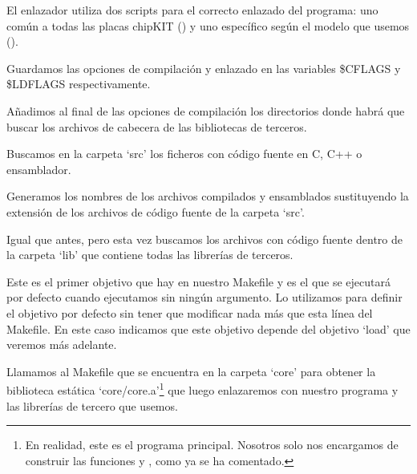  
 El enlazador utiliza dos scripts para el correcto enlazado del programa: uno común a todas las placas chipKIT () y uno específico según el modelo que usemos ().
 
 
 Guardamos las opciones de compilación y enlazado en las variables \$CFLAGS y \$LDFLAGS respectivamente.
 
 
 Añadimos al final de las opciones de compilación los directorios donde habrá que buscar los archivos de cabecera de las bibliotecas de terceros.
 
 
 Buscamos en la carpeta `src' los ficheros con código fuente en C, C++ o ensamblador.
 
 
 Generamos los nombres de los archivos compilados y ensamblados sustituyendo la extensión de los archivos de código fuente de la carpeta `src'.
 
 
 Igual que antes, pero esta vez buscamos los archivos con código fuente dentro de la carpeta `lib' que contiene todas las librerías de terceros.
 
 
 Este es el primer objetivo que hay en nuestro Makefile y es el que se ejecutará por defecto cuando ejecutamos  sin ningún argumento. Lo utilizamos para definir el objetivo por defecto sin tener que modificar nada más que esta línea del Makefile. En este caso indicamos que este objetivo depende del objetivo `load' que veremos más adelante.
 
 
 Llamamos al Makefile que se encuentra en la carpeta `core' para obtener la biblioteca estática `core/core.a'\protect\footnote{En realidad, este es el programa principal. Nosotros solo nos encargamos de construir las funciones  y , como ya se ha comentado.} que luego enlazaremos con nuestro programa y las librerías de tercero que usemos.
 
